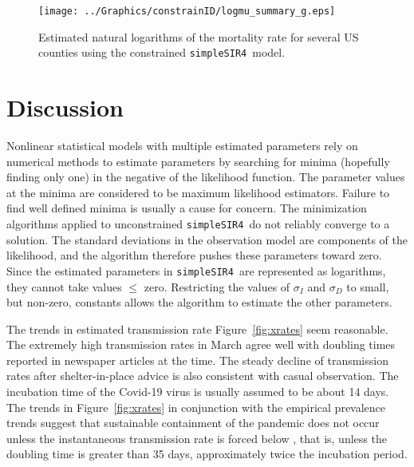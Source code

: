 \documentclass[12pt,letterpaper]{article}
\newcommand\help[1]{\color{Magenta}{\it #1 }\normalcolor}
\newcommand\SSm{{\tt simpleSIR4}}
\begin{document}
\begin{figure}
\begin{center}
\texttt{[image: ../Graphics/constrainID/logmu\_summary\_g.eps]}\\
\end{center}
\caption{\label{fig:drates}
Estimated natural logarithms of the mortality rate for several US counties using the
constrained \SSm\ model.
}
\end{figure}

\section*{Discussion}

Nonlinear statistical models with multiple estimated parameters rely
on numerical methods to estimate parameters by searching for minima
(hopefully finding only one) in the negative of the likelihood
function. The parameter values at the minima are considered to be
maximum likelihood estimators. Failure to find well defined minima is
usually a cause for concern. The minimization algorithms applied to
unconstrained \SSm\ do not reliably converge to a solution. The
standard deviations in the observation model are components of the
likelihood, and the algorithm therefore pushes these parameters toward zero.
Since the estimated parameters in \SSm\ are represented as logarithms,
they cannot take values $\le$ zero. Restricting the values of
$\sigma_I$ and $\sigma_D$ to small, but non-zero, constants allows the
algorithm to estimate the other parameters.

The trends in estimated transmission rate Figure~\ref{fig:xrates} seem
reasonable. The extremely high transmission rates in March agree well
with doubling times reported in newspaper articles at the time.
The steady decline of transmission rates after shelter-in-place advice is 
also consistent with casual observation.
The incubation time of the Covid-19 virus is usually assumed to be
about 14 days.
The trends in Figure~\ref{fig:xrates} in conjunction with the
empirical prevalence trends suggest that sustainable containment of
the pandemic does not occur unless the instantaneous transmission rate
is forced below \help{ $0.018 da^{-1}$}, that is, unless the doubling time is greater
than 35 days, approximately twice the incubation period.

\help{
Upward bump in transmission rates consistent with observed increases
in cases in July.


Omit:
Whether the available data are sufficiently informative to enable
estimation of the model parameters is a critical aspect of the
evaluation of any statistical model.
The speed at which the Covid-19 pandemic spread during the first
quarter of
2020 means that the length of the time series doubled during
the development of this model. The capability of the
model improve conveniently during the model development period,
but whether the improvement is
attributable to changes in model structure or to the increase in the
length of the time series is unclear. This ambiguity influenced the
development of the model.}
\end{document}
